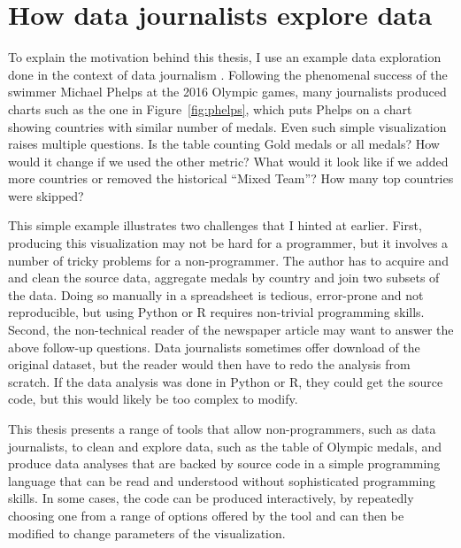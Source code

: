 \documentclass[fleqn,11pt]{report}
\theoremstyle{definition}
\begin{document}
\section{How data journalists explore data}
\label{sec:intro-ddj}

To explain the motivation behind this thesis, I use an example data exploration done in the context of
data journalism \citep{bounegru-2021-handbook}. Following the phenomenal success of the swimmer
Michael Phelps at the 2016 Olympic games, many journalists produced charts such as the one
in Figure~\ref{fig:phelps}, which puts Phelps on a chart showing countries with similar number
of medals. Even such simple visualization raises multiple questions. Is the table counting
Gold medals or all medals? How would it change if we used the other metric? What would it look like
if we added more countries or removed the historical ``Mixed Team''? How many top countries
were skipped?

This simple example illustrates two challenges that I hinted at earlier. First, producing this
visualization may not be hard for a programmer, but it involves a number of tricky problems
for a non-programmer. The author has to acquire and and clean the source data, aggregate medals by
country and join two subsets of the data. Doing so manually in a spreadsheet is tedious,
error-prone and not reproducible, but using Python or R requires non-trivial programming
skills. Second, the non-technical reader of the newspaper article may want to answer the above
follow-up questions. Data journalists sometimes offer download of the original dataset, but the
reader would then have to redo the analysis from scratch. If the data analysis was done in Python
or R, they could get the source code, but this would likely be too complex to modify.

This thesis presents a range of tools that allow non-programmers, such as data journalists, to
clean and explore data, such as the table of Olympic medals, and produce data analyses that are
backed by source code in a simple programming language that can be read and understood without
sophisticated programming skills. In some cases, the code can be produced interactively, by
repeatedly choosing one from a range of options offered by the tool and can then be modified
to change parameters of the visualization.
\end{document}
